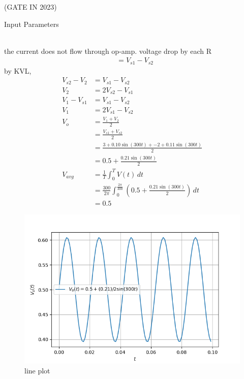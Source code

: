 \documentclass[journal,12pt,twocolumn]{IEEEtran}
\theoremstyle{remark}
\begin{document}
\begin{figure}[ht]
\centering
\resizebox{0.55\columnwidth}{!}{}
\end{figure}
\hfill{(GATE IN 2023)}\\
\solution
\fi
\begin{table}[h!]
  \centering
  
  \caption{Input Parameters}
    \label{tab:tableeshaa1}
\end{table}\\
the current does not flow through op-amp. voltage drop by each R
\begin{align}
&= V_{s1}-V_{s2}
\end{align}
by KVL,
\begin{align}
V_{s2}-V_2&=V_{s1}-V_{s2}\\
V_2&=2V_{s2}-V_{s1}\\
V_1-V_{s1}&=V_{s1}-V_{s2}\\
V_1&= 2V_{s1}-V_{s2}\\
V_o&= \frac{V_1+V_2}{2}\\
&=\frac{V_{s1}+V_{s2}}{2}\\
&=\frac{3+0.10\sin(300t)+{-2}+0.11\sin(300t)}{2}\\
&=0.5+ \frac{0.21\sin(300t)}{2}\\
V_{avg}&=\frac{1}{T} \int_{0}^{T} V(t) \,dt\\
&=\frac{300}{2\pi} \int_{0}^{\frac{2\pi}{300}} \left(0.5 + \frac{0.21 \sin(300t)}{2}\right) \, dt\\
&=0.5
\end{align}
\begin{figure}[b]
    \centering
    \includegraphics[width=\columnwidth]{2023/IN/59/figs/59fig.png}
    \caption{line plot }
    \label{fig:eshaa1}
\end{figure}
\end{document}
